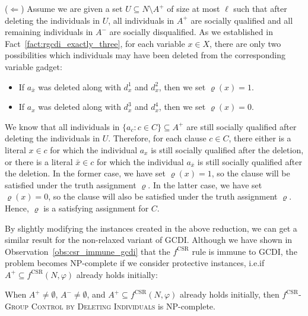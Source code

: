 \documentclass[
    12pt,               %
    a4paper,            %
    bibtotoc,           %
    pointlessnumbers,   %
    ngerman,            %
    titlepage,          %
    leqno,              %
    ]{scrarticle}       %
\newcommand\obsref{Observation~\ref}
\newcommand\factref{Fact~\ref}
\begin{document}
\begin{Proof}
($\Leftarrow$) Assume we are given a set $U \subseteq N \setminus A^+$ of size at most $\ell$ such that after deleting the individuals in $U$, all individuals in $A^+$ are socially qualified and all remaining individuals in $A^-$ are socially disqualified. As we established in \factref{fact:rgcdi_exactly_three}, for each variable $x \in X$, there are only two possibilities which individuals may have been deleted from the corresponding variable gadget:
\begin{itemize}[nolistsep, topsep=-1.25em]
\item
If $a_{\bar{x}}$ was deleted along with $d_x^1$ and $d_x^2$, then we set $\varrho(x) = 1$.
\item
If $a_x$ was deleted along with $d_x^3$ and $d_x^4$, then we set $\varrho(x) = 0$.
\end{itemize}
We know that all individuals in $\{ a_c : c \in C \} \subseteq A^+$ are still socially qualified after deleting the individuals in $U$. Therefore, for each clause $c \in C$, there either is a literal $x \in c$ for which the individual $a_x$ is still socially qualified after the deletion, or there is a literal $\bar{x} \in c$ for which the individual $a_{\bar{x}}$ is still socially qualified after the deletion. In the former case, we have set $\varrho(x) = 1$, so the clause will be satisfied under the truth assignment $\varrho$. In the latter case, we have set $\varrho(x) = 0$, so the clause will also be satisfied under the truth assignment $\varrho$. Hence, $\varrho$ is a satisfying assignment for $C$.
\end{Proof}



By slightly modifying the instances created in the above reduction, we can get a similar result for the non-relaxed variant of GCDI. Although we have shown in \obsref{obs:csr_immune_gcdi} that the $f^{\text{CSR}}$ rule is immune to GCDI, the problem becomes NP-complete if we consider protective instances, i.e.\@ if $A^+ \subseteq f^{\text{CSR}}(N, \varphi)$ already holds initially:

\begin{Corollary} \label{cor:csr_gcdi_npc}
When $A^+ \neq \emptyset$, $A^- \neq \emptyset$, and $A^+ \subseteq f^{\text{CSR}}(N, \varphi)$ already holds initially, then $f^{\text{CSR}}$-\textsc{Group Control by Deleting Individuals} is NP-complete.
\end{Corollary}
\end{document}
